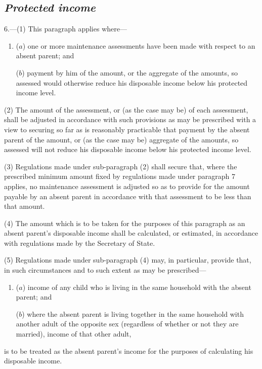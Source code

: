 \documentclass[12pt,a4paper]{article}
\begin{document}

\subsection*{\itshape Protected income}

6.---(1) This paragraph applies where—
\begin{enumerate}\item[]
($a$) one or more maintenance assessments have been made with respect to an absent parent; and

($b$) payment by him of the amount, or the aggregate of the amounts, so assessed would otherwise reduce his disposable income below his protected income level.
\end{enumerate}

(2) The amount of the assessment, or (as the case may be) of each assessment, shall be adjusted in accordance with such provisions as may be prescribed with a view to securing so far as is reasonably practicable that payment by the absent parent of the amount, or (as the case may be) aggregate of the amounts, so assessed will not reduce his disposable income below his protected income level.

(3) Regulations made under sub-paragraph (2)  shall secure that, where the prescribed minimum amount fixed by regulations made under paragraph 7 applies, no maintenance assessment is adjusted so as to provide for the amount payable by an absent parent in accordance with that assessment to be less than that amount.

(4) The amount which is to be taken for the purposes of this paragraph as an absent parent’s disposable income shall be calculated, or estimated, in accordance with regulations made by the Secretary of State.

(5) Regulations made under sub-paragraph (4)  may, in particular, provide that, in such circumstances and to such extent as may be prescribed—
\begin{enumerate}\item[]
($a$) income of any child who is living in the same household with the absent parent; and

($b$) where the absent parent is living together in the same household with another adult of the opposite sex (regardless of whether or not they are married), income of that other adult,
\end{enumerate}
is to be treated as the absent parent’s income for the purposes of calculating his disposable income.
\end{document}
